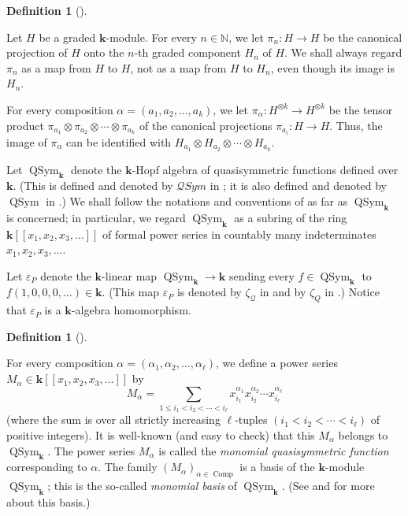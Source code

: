 \documentclass
[numbers=enddot,12pt,final,onecolumn,notitlepage,abstracton]{scrartcl}%
\theoremstyle{definition}
\newtheorem{defi}[theo]{Definition}
\newenvironment{definition}[1][]
{\begin{defi}[#1]\begin{leftbar}}
{\end{leftbar}\end{defi}}
\let\sumnonlimits\sum
\renewcommand{\sum}{\sumnonlimits\limits}
\begin{document}
\begin{definition}
\label{def.pialpha}Let $H$ be a graded $\mathbf{k}$-module. For every
$n\in\mathbb{N}$, we let $\pi_{n}:H\rightarrow H$ be the canonical projection
of $H$ onto the $n$-th graded component $H_{n}$ of $H$. We shall always regard
$\pi_{n}$ as a map from $H$ to $H$, not as a map from $H$ to $H_{n}$, even
though its image is $H_{n}$.

For every composition $\alpha=\left(  a_{1},a_{2},\ldots,a_{k}\right)  $, we
let $\pi_{\alpha}:H^{\otimes k}\rightarrow H^{\otimes k}$ be the tensor
product $\pi_{a_{1}}\otimes\pi_{a_{2}}\otimes\cdots\otimes\pi_{a_{k}}$ of the
canonical projections $\pi_{a_{i}}:H\rightarrow H$. Thus, the image of
$\pi_{\alpha}$ can be identified with $H_{a_{1}}\otimes H_{a_{2}}\otimes
\cdots\otimes H_{a_{k}}$.
\end{definition}

Let $\operatorname*{QSym}\nolimits_{\mathbf{k}}$ denote the $\mathbf{k}$-Hopf
algebra of quasisymmetric functions defined over $\mathbf{k}$. (This is
defined and denoted by $\mathcal{Q}Sym$ in \cite[\S 3]{ABS}; it is also
defined and denoted by $\operatorname*{QSym}$ in \cite[Chapter 5]{Reiner}.) We
shall follow the notations and conventions of \cite[\S 5.1]{Reiner} as far as
$\operatorname*{QSym}\nolimits_{\mathbf{k}}$ is concerned; in particular, we
regard $\operatorname*{QSym}\nolimits_{\mathbf{k}}$ as a subring of the ring
$\mathbf{k}\left[  \left[  x_{1},x_{2},x_{3},\ldots\right]  \right]  $ of
formal power series in countably many indeterminates $x_{1},x_{2},x_{3}%
,\ldots$.

Let $\varepsilon_{P}$ denote the $\mathbf{k}$-linear map $\operatorname*{QSym}%
\nolimits_{\mathbf{k}}\rightarrow\mathbf{k}$ sending every $f\in
\operatorname*{QSym}\nolimits_{\mathbf{k}}$ to $f\left(  1,0,0,0,\ldots
\right)  \in\mathbf{k}$. (This map $\varepsilon_{P}$ is denoted by
$\zeta_{\mathcal{Q}}$ in \cite[\S 4]{ABS} and by $\zeta_{Q}$ in \cite[Example
7.1.2]{Reiner}.) Notice that $\varepsilon_{P}$ is a $\mathbf{k}$-algebra homomorphism.

\begin{definition}
\label{def.Malpha}For every composition $\alpha=\left(  \alpha_{1},\alpha
_{2},\ldots,\alpha_{\ell}\right)  $, we define a power series $M_{\alpha}%
\in\mathbf{k}\left[  \left[  x_{1},x_{2},x_{3},\ldots\right]  \right]  $ by%
\[
M_{\alpha}=\sum_{1\leq i_{1}<i_{2}<\cdots<i_{\ell}}x_{i_{1}}^{\alpha_{1}%
}x_{i_{2}}^{\alpha_{2}}\cdots x_{i_{\ell}}^{\alpha_{\ell}}%
\]
(where the sum is over all strictly increasing $\ell$-tuples $\left(
i_{1}<i_{2}<\cdots<i_{\ell}\right)  $ of positive integers). It is well-known
(and easy to check) that this $M_{\alpha}$ belongs to $\operatorname*{QSym}%
\nolimits_{\mathbf{k}}$. The power series $M_{\alpha}$ is called the
\textit{monomial quasisymmetric function} corresponding to $\alpha$. The
family $\left(  M_{\alpha}\right)  _{\alpha\in\operatorname*{Comp}}$ is a
basis of the $\mathbf{k}$-module $\operatorname*{QSym}\nolimits_{\mathbf{k}}$;
this is the so-called \textit{monomial basis} of $\operatorname*{QSym}%
\nolimits_{\mathbf{k}}$. (See \cite[\S 3]{ABS} and \cite[\S 5.1]{Reiner} for
more about this basis.)
\end{definition}
\end{document}
